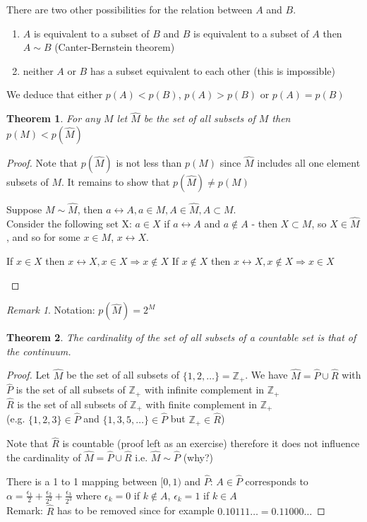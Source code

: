 \documentclass[11pt,a4paper]{report}
\newtheorem{theorem}{Theorem}[section]
\theoremstyle{plain}
\theoremstyle{definition}
\theoremstyle{remark}
\newtheorem*{rem}{Remark}
\newcommand{\Z}{\mathbb{Z}}
\newcommand{\contradiction}{\begin{flushright} \textreferencemark \end{flushright}}
\begin{document}
There are two other possibilities for the relation between $A$ and $B$.
\begin{enumerate}
  \item $A$ is equivalent to a subset of $B$ and $B$ is equivalent to a subset of $A$ then $A \sim B$ (Canter-Bernstein theorem)
  \item neither $A$ or $B$ has a subset equivalent to each other (this is impossible)
\end{enumerate}

We deduce that either $p(A) < p(B)$, $p(A) > p(B)$ or $p(A) = p(B)$

\begin{theorem}
  For any $M$ let $\hat{M}$ be the set of all subsets of $M$ then $p(M) < p(\hat{M})$
\end{theorem}

\begin{proof}
  Note that $p(\hat{M})$ is not less than $p(M)$ since $\hat{M}$ includes all one element subsets of $M$.
  It remains to show that $p(\hat{M}) \neq p(M)$

  Suppose $M \sim \hat{M}$, then $a \leftrightarrow A, a \in M, A \in \hat{M}, A \subset M$.\\
    Consider the following set X: $a\in X$ if $a \leftrightarrow A$ and $a\notin A$ - then $X \subset M$, so $X \in \hat{M}$, and so for some $x \in M$, $x \leftrightarrow X$.

  If $x\in X$ then $x \leftrightarrow X, x\in X \Rightarrow x \notin X$
  If $x \notin X$ then $x \leftrightarrow X, x\notin X \Rightarrow x \in X$
  \contradiction
\end{proof}

\begin{rem}
  Notation: $p(\hat{M}) = 2^M$
\end{rem}


\begin{theorem}
  The cardinality of the set of all subsets of a countable set is that of the continuum.
\end{theorem}

\begin{proof}
  Let $\hat{M}$ be the set of all subsets of $\{1,2,\dots\} = \Z_+$.
We have $\hat{M} = \hat{P} \cup \hat{R}$ with
$\hat{P}$ is the set of all subsets of $\Z_+$ with infinite complement in $\Z_+$\\
$\hat{R}$ is the set of all subsets of $\Z_+$ with finite complement in $\Z_+$\\
(e.g. $\{1,2,3\} \in \hat{P}$ and $\{1,3,5, \dots\} \in \hat{P}$ but $\Z_+ \in \hat{R}$)

Note that $\hat{R}$ is countable (proof left as an exercise) %
therefore it does not influence the cardinality of $\hat{M} = \hat{P} \cup \hat{R}$
i.e. $\hat{M} \sim \hat{P}$ (why?)

There is a 1 to 1 mapping between $[0,1)$ and $\hat{P}$:
$A \in \hat{P}$ corresponds to $\alpha = \frac{\epsilon_1}{2} + \frac{\epsilon_2}{2^2} + \frac{\epsilon_3}{2^3}$
where $\epsilon_k = 0$ if $k \notin A$, $\epsilon_k = 1$ if $k \in A$\\
Remark: $\hat{R}$ has to be removed since for example $0.10111\dots = 0.11000\dots$
\end{proof}
\end{document}
